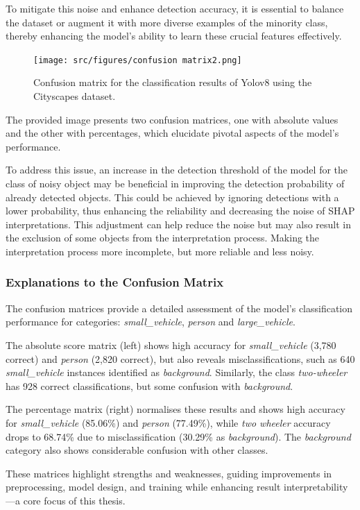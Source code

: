 To mitigate this noise and enhance detection accuracy, it is essential to balance the dataset or augment it with more diverse examples of the minority class, thereby enhancing the model's ability to learn these crucial features effectively.

\begin{figure}[h]
    \centering
    \texttt{[image: src/figures/confusion matrix2.png]}
    \caption{Confusion matrix for the classification results of Yolov8 using the Cityscapes dataset.}%
    \label{fig:Confusionmatrix}
\end{figure}

The provided image presents two confusion matrices, one with absolute values and the other with percentages, which elucidate pivotal aspects of the model's performance.

To address this issue, an increase in the detection threshold of the model for the class of noisy object  may be beneficial in improving the detection probability of already detected objects.
This could be achieved by ignoring detections with a lower probability, thus enhancing the reliability and decreasing the noise
of SHAP interpretations.
This adjustment can help reduce the noise but may also result in the exclusion of some objects from the interpretation process.
Making the interpretation process more incomplete, but more reliable and less noisy.

\subsubsection{Explanations to the Confusion Matrix}
The confusion matrices provide a detailed assessment of the model's classification performance for categories: \textit{small\_vehicle}, \textit{person} and \textit{large\_vehicle}.

The absolute score matrix (left) shows high accuracy for \textit{small\_vehicle} (3,780 correct) and \textit{person} (2,820 correct), but also reveals misclassifications, such as 640 \textit{small\_vehicle} instances identified as \textit{background}. Similarly, the class \textit{two-wheeler} has 928 correct classifications, but some confusion with \textit{background}.

The percentage matrix (right) normalises these results and shows high accuracy for \textit{small\_vehicle} (85.06\%) and \textit{person} (77.49\%), while \textit{two wheeler} accuracy drops to 68.74\% due to misclassification (30.29\% as \textit{background}). The \textit{background} category also shows considerable confusion with other classes.

These matrices highlight strengths and weaknesses, guiding improvements in preprocessing, model design, and training while enhancing result interpretability—a core focus of this thesis.



